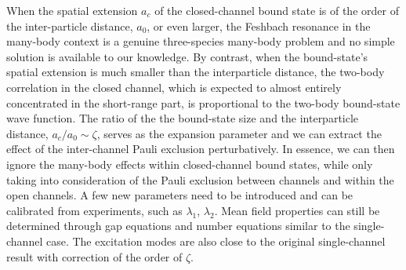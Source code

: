 \documentclass[reprint,pra]{revtex4-1}
\begin{document}
When the spatial extension $a_c$ of  the closed-channel bound state is  of the order of the   inter-particle distance, $a_{0}$, or even larger, the Feshbach resonance in the many-body context is a genuine three-species many-body problem and no simple solution is available to our knowledge.  By contrast, when the bound-state's spatial extension is much smaller than the interparticle distance, the two-body correlation in the closed channel, which is expected to almost entirely concentrated in the short-range part,  is proportional to  the two-body bound-state wave function. The ratio of the the bound-state size and the interparticle distance, $a_{c}/a_{0}\sim\zeta$, serves as the expansion parameter and we can extract  the effect of the inter-channel Pauli exclusion perturbatively.  In essence, we can then  ignore the many-body effects within  closed-channel bound states, while only taking into consideration of the Pauli exclusion between channels and within the open channels.  A few new parameters need to be introduced and can be calibrated from experiments, such as $\lambda_{1}$, $\lambda_{2}$.  Mean field properties can still be determined through gap equations and number equations similar to the single-channel case.  The excitation modes are also close to the original single-channel result with correction of the order of $\zeta$.
\end{document}
